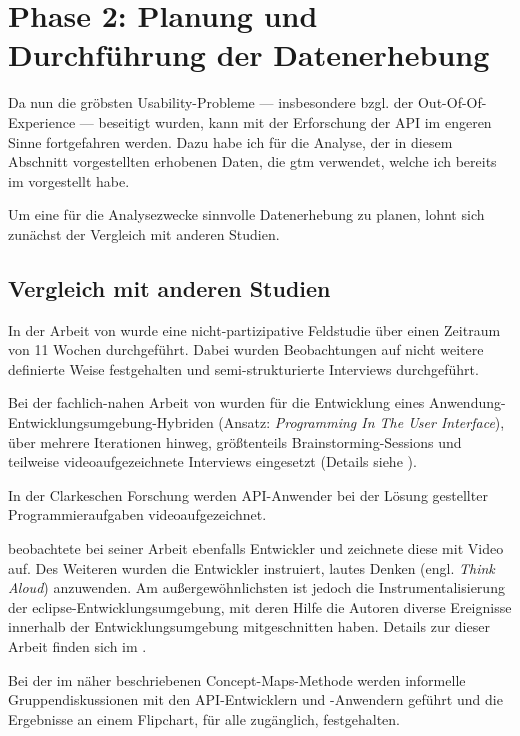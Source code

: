 \section{Phase 2: Planung und Durchführung der Datenerhebung}
\label{sec:datenerhebung}\label{sec:phase2}

Da nun die gröbsten Usability-Probleme --- insbesondere bzgl. der Out-Of-Of-Experience --- beseitigt wurden, kann mit der Erforschung der API im engeren Sinne fortgefahren werden. Dazu habe ich für die Analyse, der in diesem Abschnitt vorgestellten erhobenen Daten, die \gls{gtm} verwendet, welche ich bereits im  vorgestellt habe.

Um eine für die Analysezwecke sinnvolle Datenerhebung zu planen, lohnt sich zunächst der Vergleich mit anderen Studien.



\subsection{Vergleich mit anderen Studien}

In der Arbeit von \cite{deSouza:2004fd} wurde eine nicht-partizipative Feldstudie über einen Zeitraum von 11 Wochen durchgeführt. Dabei wurden Beobachtungen auf nicht weitere definierte Weise festgehalten und semi-strukturierte Interviews durchgeführt.

Bei der fachlich-nahen Arbeit von \cite{Letondal:2006dy} wurden für die Entwicklung eines Anwendung-Entwicklungsumgebung-Hybriden (Ansatz: \textit{Programming In The User Interface}), über mehrere Iterationen hinweg, größtenteils Brainstorming-Sessions und teilweise videoaufgezeichnete Interviews eingesetzt (Details siehe ).

In der Clarkeschen Forschung \citep[u.a.][]{clarke:2006} werden API-Anwender bei der Lösung gestellter Programmieraufgaben videoaufgezeichnet.

\cite{LaToza:2007fj} beobachtete bei seiner Arbeit ebenfalls Entwickler und zeichnete diese mit Video auf. Des Weiteren wurden die Entwickler instruiert, lautes Denken (engl. \textit{Think Aloud}) anzuwenden. Am außergewöhnlichsten ist jedoch die Instrumentalisierung der \gls{eclipse}-Entwicklungsumgebung, mit deren Hilfe die Autoren diverse Ereignisse innerhalb der Entwicklungsumgebung mitgeschnitten haben. Details zur dieser Arbeit finden sich im .

Bei der im  näher beschriebenen Concept-Maps-Methode \citep{Tenny:2011jp} werden informelle Gruppendiskussionen mit den API-Entwicklern und -Anwendern geführt und die Ergebnisse an einem Flipchart, für alle zugänglich, festgehalten.


